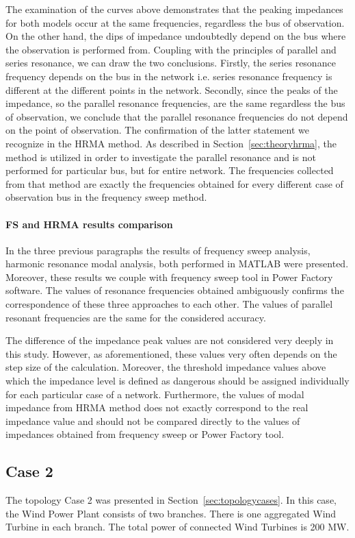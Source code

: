 \documentclass[12pt]{report} %
\begin{document}
The examination of the curves above demonstrates that the peaking impedances for both models occur at the same frequencies, regardless the bus of observation. On the other hand, the dips of impedance undoubtedly depend on the bus where the observation is performed from. Coupling with the principles of parallel and series resonance, we can draw the two conclusions. Firstly, the series resonance frequency depends on the bus in the network i.e. series resonance frequency is different at the different points in the network. Secondly, since the peaks of the impedance, so the parallel resonance frequencies, are the same regardless the bus of observation, we conclude that the parallel resonance frequencies do not depend on the point of observation. The confirmation of the latter statement we recognize in the HRMA method. As described in Section~\ref{sec:theoryhrma}, the method is utilized in order to investigate the parallel resonance and is not performed for particular bus, but for entire network. The frequencies collected from that method are exactly the frequencies obtained for every different case of observation bus in the frequency sweep method.

\paragraph{FS and HRMA results comparison}
In the three previous paragraphs the results of frequency sweep analysis, harmonic resonance modal analysis, both performed in MATLAB were presented. Moreover, these results we couple with frequency sweep tool in Power Factory software. The values of resonance frequencies obtained ambiguously confirms the correspondence of these three approaches to each other. The values of parallel resonant frequencies are the same for the considered accuracy.

The difference of the impedance peak values are not considered very deeply in this study. However, as aforementioned, these values very often depends on the step size of the calculation. Moreover, the threshold impedance values above which the impedance level is defined as dangerous should be assigned individually for each particular case of a network. Furthermore, the values of modal impedance from HRMA method does not exactly correspond to the real impedance value and should not be compared directly to the values of impedances obtained from frequency sweep or Power Factory tool.

\subsection{Case 2}
The topology Case 2 was presented in Section~\ref{sec:topologycases}. In this case, the Wind Power Plant consists of two branches. There is one aggregated Wind Turbine in each branch. The total power of connected Wind Turbines is 200 MW.
\end{document}

